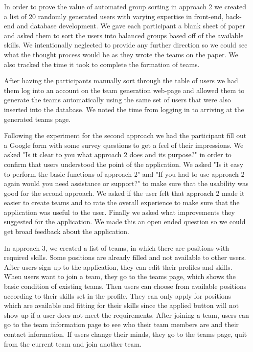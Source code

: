 \documentclass[conference]{IEEEtran}
\begin{document}
In order to prove the value of automated group sorting in approach 2 we created a list of 20 randomly generated users with varying expertise in front-end, back-end and database development. We gave each participant a blank sheet of paper and asked them to sort the users into balanced groups based off of the available skills. We intentionally neglected to provide any further direction so we could see what the thought process would be as they wrote the teams on the paper. We also tracked the time it took to complete the formation of teams. 

After having the participants manually sort through the table of users we had them log into an account on the team generation web-page and allowed them to generate the teams automatically using the same set of users that were also inserted into the database. We noted the time from logging in to arriving at the generated teams page.

Following the experiment for the second approach we had the participant fill out a Google form with some survey questions to get a feel of their impressions. We asked "Is it clear to you what approach 2 does and its purpose?" in order to confirm that users understood the point of the application. We asked "Is it easy to perform the basic functions of approach 2" and "If you had to use approach 2 again would you need assistance or support?" to make sure that the usability was good for the second approach. We asked if the user felt that approach 2 made it easier to create teams and to rate the overall experience to make sure that the application was useful to the user. Finally we asked what improvements they suggested for the application. We made this an open ended question so we could get broad feedback about the application. 

In approach 3, we created a list of teams, in which there are positions with required skills. Some positions are already filled and not available to other users. After users sign up to the application, they can edit their profiles and skills. When users want to join a team, they go to the teams page, which shows the basic condition of existing teams. Then users can choose from available positions according to their skills set in the profile. They can only apply for positions which are available and fitting for their skills since the applied button will not show up if a user does not meet the requirements. After joining a team, users can go to the team information page to see who their team members are and their contact information. If users change their minds, they go to the teams page, quit from the current team and join another team. 
\end{document}
